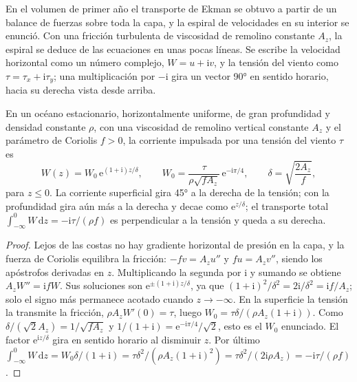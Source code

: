 En el volumen de primer año el transporte de Ekman se obtuvo a partir de un balance de fuerzas
sobre toda la capa, y la espiral de velocidades en su interior se enunció. Con
una fricción turbulenta de viscosidad de remolino constante $A_z$, la espiral se deduce
de las ecuaciones en unas pocas líneas. Se escribe la velocidad horizontal como un
número complejo, $W = u + \mathrm iv$, y la tensión del viento como $\tau =
\tau_x + \mathrm i\tau_y$; una multiplicación por $-\mathrm i$ gira un vector
\ang{90} en sentido horario, hacia su derecha vista desde arriba.

\begin{theorem}\label{thm:b3:ocean-dynamics:ekman}
En un océano estacionario, horizontalmente uniforme, de gran profundidad y densidad constante
$\rho$, con una viscosidad de remolino vertical constante $A_z$ y el parámetro de Coriolis
$f > 0$, la corriente impulsada por una tensión del viento $\tau$ es
\[
W(z) = W_0\,\mathrm e^{(1+\mathrm i)z/\delta},\qquad
W_0 = \frac{\tau}{\rho\sqrt{fA_z}}\,\mathrm e^{-\mathrm i\pi/4},\qquad
\delta = \sqrt{\frac{2A_z}{f}} ,
\]
para $z \le 0$. La corriente superficial gira \ang{45} a la derecha de la
tensión; con la profundidad gira aún más a la derecha y decae como $\mathrm
e^{z/\delta}$; el transporte total $\int_{-\infty}^0 W\,\mathrm dz =
-\mathrm i\tau/(\rho f)$ es perpendicular a la tensión y queda a su derecha.
\end{theorem}

\begin{proof}
Lejos de las costas no hay gradiente horizontal de presión en la capa,
y la fuerza de Coriolis equilibra la fricción: $-fv = A_z u''$ y $fu =
A_z v''$, siendo los apóstrofos derivadas en $z$. Multiplicando la segunda por
$\mathrm i$ y sumando se obtiene $A_zW'' = \mathrm ifW$. Sus soluciones son
$\mathrm e^{\pm(1+\mathrm i)z/\delta}$, ya que $(1+\mathrm i)^2/\delta^2 =
2\mathrm i/\delta^2 = \mathrm if/A_z$; solo el signo más permanece acotado cuando
$z \to -\infty$. En la superficie la tensión la transmite la fricción,
$\rho A_zW'(0) = \tau$, luego $W_0 = \tau\delta/(\rho A_z(1+\mathrm i))$.
Como $\delta/(\sqrt2 A_z) = 1/\sqrt{fA_z}$ y $1/(1+\mathrm i) = \mathrm
e^{-\mathrm i\pi/4}/\sqrt2$, esto es el $W_0$ enunciado. El factor
$\mathrm e^{\mathrm iz/\delta}$ gira en sentido horario al disminuir $z$. Por último
$\int_{-\infty}^0 W\,\mathrm dz = W_0\delta/(1+\mathrm i) =
\tau\delta^2/(\rho A_z(1+\mathrm i)^2) = \tau\delta^2/(2\mathrm i\rho A_z)
= -\mathrm i\tau/(\rho f)$.
\end{proof}

